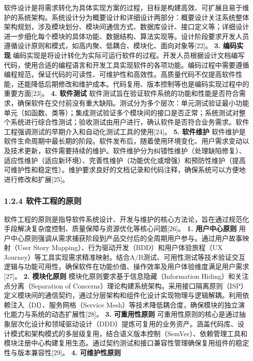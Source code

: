 软件设计是将需求转化为具体实现方案的过程，目标是构建高效、可扩展且易于维护的系统架构。系统设计分为概要设计和详细设计两部分：概要设计关注系统整体架构规划，涉及模块划分、模块间通信方式、数据库设计、接口定义等；详细设计进一步细化每个模块的具体功能、数据结构、算法实现等。设计阶段要求开发人员遵循设计原则和模式，如高内聚、低耦合、模块化、面向对象等{[}22{]}。 \textbf{3. 编码实现} 编码实现是将设计转化为实际可运行软件的过程。开发人员根据设计文档编写代码，使用合适的编程语言和开发工具实现软件的各项功能。编码过程中需要遵循编程规范，保证代码的可读性、可维护性和高效性。高质量代码不仅提高软件性能，还能降低后期修改和维护成本。代码复用、版本控制等也是编码实现过程中的重要方面{[}23{]}。 \textbf{4. 软件测试} 软件测试旨在验证软件系统的功能和性能是否符合需求，确保软件在交付前没有重大缺陷。测试分为多个层次：单元测试验证最小功能单元（如函数、类等）；集成测试验证多个模块间的接口是否正常；系统测试对整个系统进行综合性测试；验收测试由用户进行，确认软件是否符合业务需求。软件工程强调测试的早期介入和自动化测试工具的使用{[}24{]}。 \textbf{5. 软件维护} 软件维护是软件生命周期中最长期的阶段。软件发布后，随着使用环境变化、用户需求变动以及技术更新，软件需要持续的维护。软件维护分为纠错性维护（处理缺陷修复）、适应性维护（适应新环境）、完善性维护（功能优化或增强）和预防性维护（提高可维护性和稳定性）。维护要求良好的文档记录和代码注释，确保系统可以方便地进行修改和扩展{[}25{]}。 \subsubsection{1.2.4 软件工程的原则}\label{ux8f6fux4ef6ux5de5ux7a0bux7684ux539fux5219} 软件工程的原则是指导软件系统设计、开发与维护的核心方法论，旨在通过规范化手段解决复杂度控制、质量保障与资源优化等核心问题{[}26{]}。 \textbf{1. 用户中心原则} 用户中心原则强调从需求捕获阶段到产品交付后的全周期用户参与。通过用户故事映射（User Story Mapping）、行为驱动开发（BDD）和用户体验旅程（UX Journey）等工具实现需求精准映射。结合A/B测试、可用性测试等技术验证交互逻辑与功能可用性，确保软件在功能价值、操作效率及用户体验维度满足用户需求{[}27{]}。 \textbf{2. 模块化原则} 模块化原则要求基于信息隐藏（Information Hiding）和关注点分离（Separation of Concerns）理论构建系统架构。采用接口隔离原则（ISP）定义模块间的通信契约，通过分层架构和组件化设计实现物理与逻辑解耦。利用依赖注入（DI）、服务网格（Service Mesh）等技术降低耦合度，确保模块的独立演化能力与系统的动态扩展性{[}28{]}。 \textbf{3. 可重用性原则} 可重用性原则的核心是通过抽象层次化设计和领域驱动设计（DDD）提炼可复用的业务资产。涵盖代码库、设计模式和架构模式的多层级复用，结合语义版本控制（SemVer）、依赖管理工具和模块注册中心构建复用生态。通过契约测试和接口兼容性管理确保复用组件的稳定性与版本兼容性{[}29{]}。 \textbf{4. 可维护性原则} 